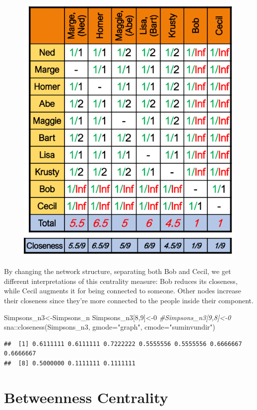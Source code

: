 \documentclass[
  notitlepage,
  onecolumn,
  openany]{book}
\newenvironment{Shaded}{\begin{snugshade}}{\end{snugshade}}
\newcommand{\AttributeTok}[1]{\textcolor[rgb]{0.77,0.63,0.00}{#1}}
\newcommand{\CommentTok}[1]{\textcolor[rgb]{0.56,0.35,0.01}{\textit{#1}}}
\newcommand{\DecValTok}[1]{\textcolor[rgb]{0.00,0.00,0.81}{#1}}
\newcommand{\FunctionTok}[1]{\textcolor[rgb]{0.00,0.00,0.00}{#1}}
\newcommand{\NormalTok}[1]{#1}
\newcommand{\OtherTok}[1]{\textcolor[rgb]{0.56,0.35,0.01}{#1}}
\newcommand{\SpecialCharTok}[1]{\textcolor[rgb]{0.00,0.00,0.00}{#1}}
\newcommand{\StringTok}[1]{\textcolor[rgb]{0.31,0.60,0.02}{#1}}
\begin{document}
\begin{figure}[h!]

{\centering \includegraphics[width=0.5\linewidth]{images/04-Centrality/Untitled 4} 

}

\end{figure}

By changing the network structure, separating both Bob and Cecil, we get different interpretations of this centrality measure: Bob reduces its closeness, while Cecil augments it for being connected to someone. Other nodes increase their closeness since they're more connected to the people inside their component.

\begin{Shaded}
\begin{Highlighting}[]
\NormalTok{Simpsons\_n3}\OtherTok{\textless{}{-}}\NormalTok{Simpsons\_n}
\NormalTok{Simpsons\_n3[}\DecValTok{8}\NormalTok{,}\DecValTok{9}\NormalTok{]}\OtherTok{\textless{}{-}}\DecValTok{0}
\CommentTok{\#Simpsons\_n3[9,8]\textless{}{-}0}
\NormalTok{sna}\SpecialCharTok{::}\FunctionTok{closeness}\NormalTok{(Simpsons\_n3, }
               \AttributeTok{gmode=}\StringTok{"graph"}\NormalTok{, }
               \AttributeTok{cmode=}\StringTok{"suminvundir"}\NormalTok{)}
\end{Highlighting}
\end{Shaded}

\begin{verbatim}
##  [1] 0.6111111 0.6111111 0.7222222 0.5555556 0.5555556 0.6666667 0.6666667
##  [8] 0.5000000 0.1111111 0.1111111
\end{verbatim}

\hypertarget{betweenness-centrality}{%
\section{Betweenness Centrality}\label{betweenness-centrality}}
\end{document}
